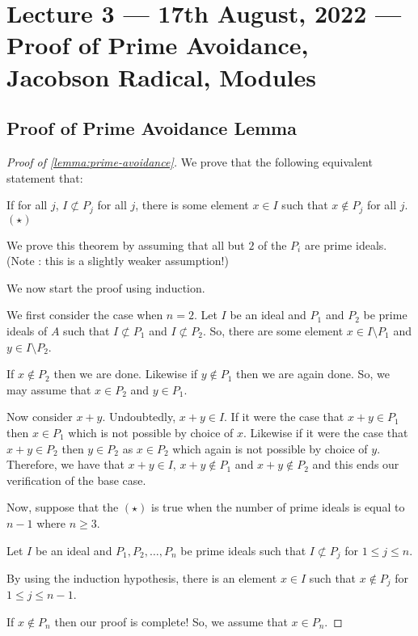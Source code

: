 \section{Lecture 3 --- 17th August, 2022 --- Proof of Prime Avoidance, Jacobson Radical, Modules}
\subsection{Proof of Prime Avoidance Lemma}
\begin{proof}[Proof of \ref{lemma:prime-avoidance}]
    We prove that the following equivalent statement that:
    
    If for all $j$, $I\not\subset P_j$ for all $j$, there is some element $x\in I$ such that $x\not\in P_j$ for all $j$. $(\star)$


    We prove this theorem by assuming that all but $2$ of the $P_i$ are prime ideals. (Note : this is a slightly weaker assumption!)
    
     We now start the proof using induction.
    
    We first consider the case when $n=2$. Let $I$ be an ideal and $P_1$ and $P_2$ be prime ideals of $A$ such that $I \not \subset P_1$ and $I \not \subset P_2$. So, there are some element $x\in I \setminus P_1$ and $y\in I \setminus P_2$.

    If $x\not \in P_2$ then we are done. Likewise if $y\not \in P_1$ then we are again done. So, we may assume that $x\in P_2$ and $y\in P_1$.

    Now consider $x+y$. Undoubtedly, $x+y \in I$. If it were the case that $x+y \in P_1$ then $x\in P_1$ which is not possible by choice of $x$. Likewise if it were the case that $x+y \in P_2$ then $y \in P_2$ as $x\in P_2$ which again is not possible by choice of $y$. Therefore, we have that $x+y \in I$, $x+y \not \in P_1$ and $x+y \not \in P_2$ and this ends our verification of the base case.

    Now, suppose that the $(\star)$ is true when the number of prime ideals is equal to $n-1$ where $n\ge 3$. 

    Let $I$ be an ideal and $P_1 , P_2 , \ldots , P_n$ be prime ideals such that $I \not \subset P_j$ for $1\le j \le n$. 

    By using the induction hypothesis, there is an element $x\in I$ such that $x \not \in P_j$ for $1 \le j \le n-1$.


    If $x\not\in P_n$ then our proof is complete! So, we assume that $x\in P_n$.
    

\end{proof}
